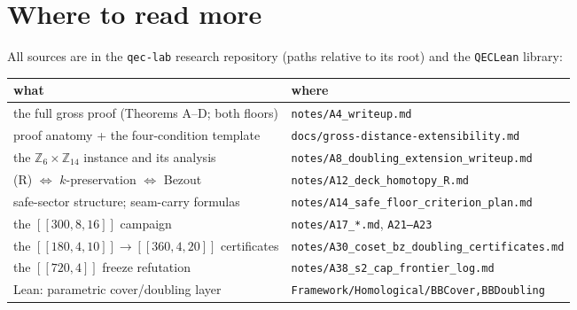 \documentclass[11pt]{article}
\theoremstyle{plain}
\theoremstyle{definition}
\theoremstyle{remark}
\newcommand{\Z}{\mathbb{Z}}
\begin{document}
\section{Where to read more}
\label{sec:further}

All sources are in the \texttt{qec-lab} research repository (paths relative
to its root) and the \texttt{QECLean} library:

\begin{center}
\footnotesize
\begin{tabular}{ll}
\toprule
what & where\\
\midrule
the full gross proof (Theorems A--D; both floors) &
\texttt{notes/A4\_writeup.md}\\
proof anatomy + the four-condition template &
\texttt{docs/gross-distance-extensibility.md}\\
the $\Z_6{\times}\Z_{14}$ instance and its analysis &
\texttt{notes/A8\_doubling\_extension\_writeup.md}\\
(R) $\Leftrightarrow$ $k$-preservation $\Leftrightarrow$ Bezout &
\texttt{notes/A12\_deck\_homotopy\_R.md}\\
safe-sector structure; seam-carry formulas &
\texttt{notes/A14\_safe\_floor\_criterion\_plan.md}\\
the $[[300,8,16]]$ campaign &
\texttt{notes/A17\_*.md}, \texttt{A21--A23}\\
the $[[180,4,10]] \to [[360,4,20]]$ certificates &
\texttt{notes/A30\_coset\_bz\_doubling\_certificates.md}\\
the $[[720,4]]$ freeze refutation &
\texttt{notes/A38\_s2\_cap\_frontier\_log.md}\\
Lean: parametric cover/doubling layer &
\texttt{Framework/Homological/BBCover,BBDoubling}\\
\bottomrule
\end{tabular}
\end{center}

\end{document}
